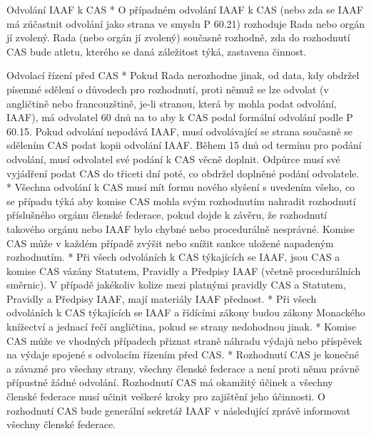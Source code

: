 Odvolání IAAF k CAS
* O případném odvolání IAAF k CAS (nebo zda se IAAF má zúčastnit odvolání jako strana ve smyslu P 60.21)  rozhoduje Rada nebo orgán jí zvolený. Rada (nebo orgán jí zvolený) současně rozhodně, zda do rozhodnutí CAS bude atletu, kterého se daná záležitost týká, zastavena činnost.

Odvolací řízení před CAS
* Pokud Rada nerozhodne jinak, od data, kdy obdržel písemné sdělení o důvodech pro rozhodnutí,  proti němuž se lze odvolat (v angličtině nebo francouzštině, je-li stranou, která by mohla podat odvolání, IAAF), má odvolatel 60 dnů na to aby k CAS podal  formální odvolání podle P 60.15. Pokud odvolání nepodává IAAF, musí odvolávající se strana současně se sdělením CAS podat kopii odvolání IAAF. Během 15 dnů od termínu pro podání odvolání, musí odvolatel své podání k CAS věcně doplnit. Odpůrce musí své vyjádření podat CAS do třiceti dní poté, co obdržel doplněné podání odvolatele.
* Všechna odvolání k CAS musí mít formu nového slyšení s uvedením všeho, co se případu týká aby komise CAS mohla svým rozhodnutím nahradit rozhodnutí příslušného orgánu členské federace, pokud dojde k závěru, že rozhodnutí takového orgánu nebo IAAF bylo chybné nebo procedurálně nesprávné. Komise CAS může v každém případě zvýšit nebo snížit sankce uložené napadeným rozhodnutím.
* Při všech odvoláních k CAS týkajících se IAAF, jsou CAS a komise CAS vázány Statutem, Pravidly a Předpisy IAAF (včetně procedurálních směrnic). V případě jakékoliv kolize mezi platnými pravidly CAS a Statutem, Pravidly a Předpisy IAAF, mají materiály IAAF přednost.
* Při všech odvoláních k CAS týkajících se IAAF a řídícími zákony budou zákony Monackého knížectví a jednací řečí angličtina, pokud se strany nedohodnou jinak.
* Komise CAS může ve vhodných případech přiznat straně náhradu výdajů nebo příspěvek na výdaje spojené s odvolacím řízením před CAS.
* Rozhodnutí CAS je konečné a závazné pro všechny strany, všechny členské federace a není proti němu právně přípustné žádné odvolání. Rozhodnutí CAS má okamžitý účinek a všechny členské federace musí učinit veškeré kroky pro zajištění jeho účinnosti. O rozhodnutí CAS bude generální sekretář IAAF v následující zprávě informovat všechny členské federace.
\enditems

\endinput